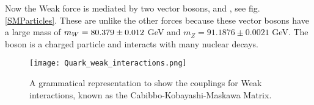 
Now the Weak force is mediated by two vector bosons, \W{} and \Z, see fig. \ref{SMParticles}. These are unlike the other forces because these vector bosons have a large mass of $m_{W}=80.379\pm0.012$ GeV and $m_Z=91.1876\pm0.0021$ GeV. The \W{} boson is a charged particle and interacts with many nuclear decays. 

\begin{figure}
 	\centering
	\texttt{[image: Quark\_weak\_interactions.png]}
 	\caption[CKM Matrix Couplings]{A grammatical representation to show the couplings for Weak interactions, known as the Cabibbo-Kobayashi-Maskawa Matrix. }
 	\label{CKMInteractions} 
\end{figure}

